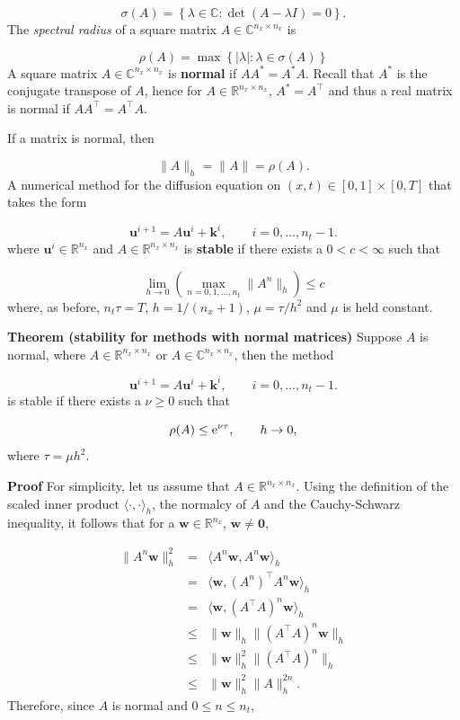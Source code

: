 \documentclass[12pt,a4paper]{article}
\begin{document}
\[
\sigma(A) = \left\lbrace \lambda \in \mathbb{C} : \det(A - \lambda I)= 0  \right\rbrace.
\]
The \emph{spectral radius} of a square matrix $A \in \mathbb{C}^{n_x \times n_x}$ is

\[
\rho(A) = \max\left\lbrace \vert \lambda \vert : \lambda \in \sigma(A)\right\rbrace
\]
A square matrix $A \in \mathbb{C}^{n_x \times n_x}$ is \textbf{normal} if $AA^{*} = A^{*}A$.  Recall that $A^*$ is the conjugate transpose of $A$, hence for  $A \in \mathbb{R}^{n_x \times n_x}$, $A^{*} = A^{\top}$ and thus a real matrix is normal if $AA^{\top} = A^{\top}A$.

If a matrix is normal, then

\[
\| A \|_h =\| A \| = \rho(A).
\]
A numerical method for the diffusion equation on $(x,t)\in [0, 1]\times[0, T]$ that takes the form

\[
\mathbf{u}^{i+1} = A\mathbf{u}^i + \mathbf{k}^i, \qquad i = 0, \ldots, n_t-1.
\]
where $\mathbf{u}^i \in \mathbb{R}^{n_x}$ and $A \in \mathbb{R}^{n_x \times n_x}$ is \textbf{stable} if there exists a $0 < c < \infty$ such that

\[
\lim_{h \to 0}\left( \max_{n = 0, 1, \ldots, n_t} \| A^n \|_h  \right) \leq c
\]
where, as before, $n_t\tau = T$, $h = 1/(n_x + 1)$, $\mu = \tau/h^2$ and $\mu$ is held constant.

\textbf{Theorem (stability for methods with normal matrices)} Suppose $A$ is normal, where $A \in \mathbb{R}^{n_x \times n_x}$ or $A \in \mathbb{C}^{n_x \times n_x}$,  then the method 

\[
\mathbf{u}^{i+1} = A\mathbf{u}^i + \mathbf{k}^i, \qquad i = 0, \ldots, n_t-1.
\]
is stable if there exists a $\nu \geq 0$ such that

\[
\rho(A) \leq {\rm e}^{\nu \tau}, \qquad h \to 0,
\]
where $\tau = \mu h^2$. 

\textbf{Proof}  For simplicity, let us assume that $A \in \mathbb{R}^{n_x \times n_x}$.  Using the definition of the scaled inner product $\langle \cdot, \cdot \rangle_h$, the normalcy of $A$ and the Cauchy-Schwarz inequality, it follows that for a $\mathbf{w} \in \mathbb{R}^{n_x}$, $\mathbf{w} \neq \mathbf{0}$,


\begin{eqnarray*}
\| A^n \mathbf{w} \|_h^2 &=& \langle A^n\mathbf{w}, A^n\mathbf{w}\rangle_h \\
&=& \langle \mathbf{w},  \left(A^n\right)^{\top}A^n\mathbf{w}\rangle_h \\
&=&  \langle \mathbf{w},  \left(A^{\top}A\right)^n\mathbf{w}\rangle_h \\ 
&\leq & \|  \mathbf{w}\|_h \|\left(A^{\top}A\right)^n\mathbf{w}\|_h \\
&\leq & \|  \mathbf{w}\|_h^2 \|\left(A^{\top}A\right)^n\|_h \\
&\leq & \|  \mathbf{w}\|_h^2 \|A\|_h^{2n}.
\end{eqnarray*}
Therefore, since $A$ is normal and $0 \leq  n \leq n_t$,
\end{document}
